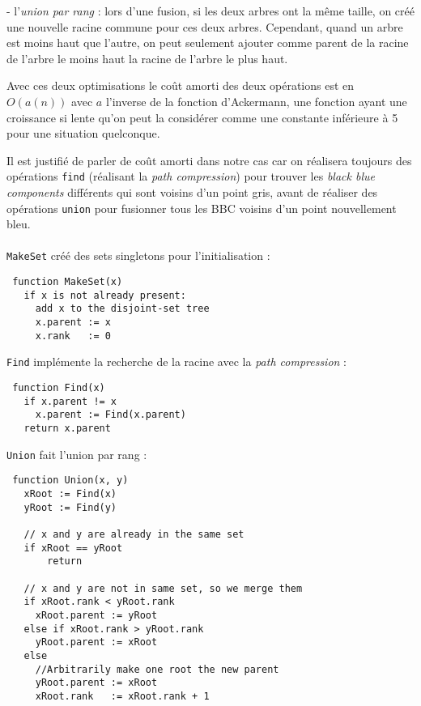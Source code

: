 - l'\textit{union par rang} : lors d'une fusion, si les deux arbres ont la même taille, on créé une nouvelle racine commune pour ces deux arbres. Cependant, quand un arbre est moins haut que l'autre, on peut seulement ajouter comme parent de la racine de l'arbre le moins haut la racine de l'arbre le plus haut.

Avec ces deux optimisations le coût amorti des deux opérations est en $O(a(n))$ avec $a$ l'inverse de la fonction d'Ackermann, une fonction ayant une croissance si lente qu'on peut la considérer comme une constante inférieure à 5 pour une situation quelconque.

Il est justifié de parler de coût amorti dans notre cas car on réalisera toujours des opérations \verb?find? (réalisant la \textit{path compression}) pour trouver les \textit{black blue components} différents qui sont voisins d'un point gris, avant de réaliser des opérations \verb?union? pour fusionner tous les BBC voisins d'un point nouvellement bleu.

\paragraph{}
\verb?MakeSet? créé des sets singletons pour l'initialisation :
\begin{lstlisting}
 function MakeSet(x)
   if x is not already present:
     add x to the disjoint-set tree
     x.parent := x
     x.rank   := 0
\end{lstlisting}

\verb?Find? implémente la recherche de la racine avec la \textit{path compression} :
\begin{lstlisting}
 function Find(x)
   if x.parent != x
     x.parent := Find(x.parent)
   return x.parent
\end{lstlisting}

\verb?Union? fait l'union par rang :
\begin{lstlisting}
 function Union(x, y)
   xRoot := Find(x)
   yRoot := Find(y)
 
   // x and y are already in the same set
   if xRoot == yRoot            
       return
   
   // x and y are not in same set, so we merge them
   if xRoot.rank < yRoot.rank
     xRoot.parent := yRoot
   else if xRoot.rank > yRoot.rank
     yRoot.parent := xRoot
   else
     //Arbitrarily make one root the new parent
     yRoot.parent := xRoot    
     xRoot.rank   := xRoot.rank + 1
\end{lstlisting}


